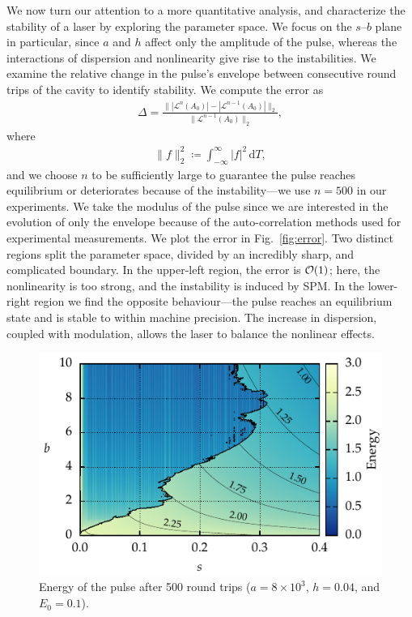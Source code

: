 \documentclass[9pt,twocolumn,twoside]{osajnl}
\let\originalleft\left
\let\originalright\right
\renewcommand{\left}{\mathopen{}\mathclose\bgroup\originalleft}
\renewcommand{\right}{\aftergroup\egroup\originalright}
\providecommand{\df}{\textrm{d}} %
\providecommand{\bigO}[1]{\ensuremath{\mathop{}\mathopen{}\mathcal{O}\mathopen{}\left(#1\right)}} %
\begin{document}
We now turn our attention to a more quantitative analysis, and characterize the stability of a laser by exploring the parameter space. We focus on the $s$--$b$ plane in particular, since $a$ and $h$ affect only the amplitude of the pulse, whereas the interactions of dispersion and nonlinearity give rise to the instabilities. We examine the relative change in the pulse's envelope between consecutive round trips of the cavity to identify stability. We compute the error as
\begin{align}
	\Delta = \frac{\| |\mathcal{L}^n(A_0)| - |\mathcal{L}^{n-1}(A_0)| \|_2}{\| \mathcal{L}^{n-1}(A_0) \|_2},
	\label{eq:error}
\end{align}
where
\begin{align}
	\| f \|_2^2 \coloneqq \int_{-\infty}^\infty |f|^2 \, \df T,
\end{align}
and we choose $n$ to be sufficiently large to guarantee the pulse reaches equilibrium or deteriorates because of the instability---we use $n = 500$ in our experiments. We take the modulus of the pulse since we are interested in the evolution of only the envelope because of the auto-correlation methods used for experimental measurements. We plot the error in Fig.~\ref{fig:error}. Two distinct regions split the parameter space, divided by an incredibly sharp, and complicated boundary. In the upper-left region, the error is $\bigO{1}$; here, the nonlinearity is too strong, and the instability is induced by SPM. In the lower-right region we find the opposite behaviour---the pulse reaches an equilibrium state and is stable to within machine precision. The increase in dispersion, coupled with modulation, allows the laser to balance the nonlinear effects. 

\begin{figure}[tbp]
	\centering
	\includegraphics{Figures/ParamSpaceEnergy}
	\caption{Energy of the pulse after 500 round trips ($a = 8 \times 10^3$, $h = 0.04$, and $E_0 = 0.1$).}
	\label{fig:energy}
\end{figure}
\end{document}
